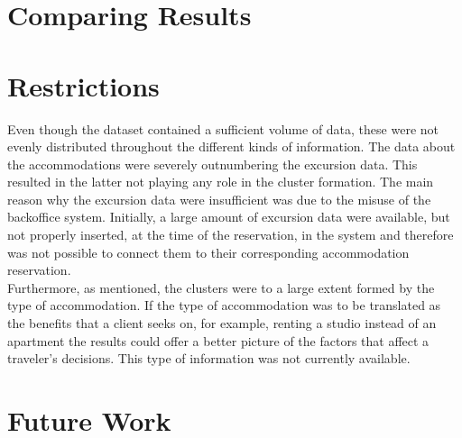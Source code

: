 \section{Comparing Results}
\section{Restrictions}
Even though the dataset contained a sufficient volume of data, these were not evenly distributed throughout the different kinds of information. The data about the accommodations were severely outnumbering the excursion data. This resulted in the latter not playing any role in the cluster formation. The main reason why the excursion data were insufficient was due to the misuse of the backoffice system. Initially, a large amount of excursion data were available, but not properly inserted, at the time of the reservation, in the system and therefore was not possible to connect them to their corresponding accommodation reservation. \\
Furthermore, as mentioned, the clusters were to a large extent formed by the type of accommodation. If the type of accommodation was to be translated as the benefits that a client seeks on, for example, renting a studio instead of an apartment the results could offer a better picture of the factors that affect a traveler's decisions. This type of information was not currently available.
\section{Future Work}